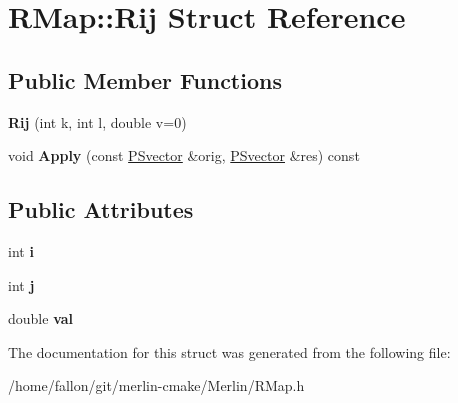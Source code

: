 \hypertarget{structRMap_1_1Rij}{}\section{R\+Map\+:\+:Rij Struct Reference}
\label{structRMap_1_1Rij}
\subsection*{Public Member Functions}
\begin{DoxyCompactItemize}
\item 
\mbox{\label{structRMap_1_1Rij_a64a4b6c099409023fc69eaa8f98ff502}} 
{\bfseries Rij} (int k, int l, double v=0)
\item 
\mbox{\label{structRMap_1_1Rij_a7da88a7c2c0b4d0e159925c1b4cb9c8b}} 
void {\bfseries Apply} (const \hyperlink{classPSvector}{P\+Svector} \&orig, \hyperlink{classPSvector}{P\+Svector} \&res) const
\end{DoxyCompactItemize}
\subsection*{Public Attributes}
\begin{DoxyCompactItemize}
\item 
\mbox{\label{structRMap_1_1Rij_a2db29f34d16591749a87bb898895ff4e}} 
int {\bfseries i}
\item 
\mbox{\label{structRMap_1_1Rij_a7a58538cda98f8fe523c92e53fdf6fdc}} 
int {\bfseries j}
\item 
\mbox{\label{structRMap_1_1Rij_aac7f4376689a0bb67e2cd78dca9b9c9d}} 
double {\bfseries val}
\end{DoxyCompactItemize}


The documentation for this struct was generated from the following file\+:\begin{DoxyCompactItemize}
\item 
/home/fallon/git/merlin-\/cmake/\+Merlin/R\+Map.\+h\end{DoxyCompactItemize}
